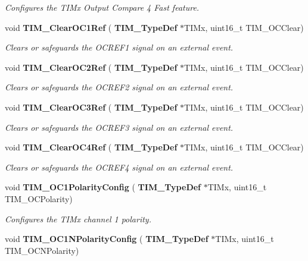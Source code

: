 \begin{DoxyCompactItemize}
\begin{DoxyCompactList}\small\item\em Configures the T\+I\+Mx Output Compare 4 Fast feature. \end{DoxyCompactList}\item 
void \textbf{ T\+I\+M\+\_\+\+Clear\+O\+C1\+Ref} (\textbf{ T\+I\+M\+\_\+\+Type\+Def} $\ast$T\+I\+Mx, uint16\+\_\+t T\+I\+M\+\_\+\+O\+C\+Clear)
\begin{DoxyCompactList}\small\item\em Clears or safeguards the O\+C\+R\+E\+F1 signal on an external event. \end{DoxyCompactList}\item 
void \textbf{ T\+I\+M\+\_\+\+Clear\+O\+C2\+Ref} (\textbf{ T\+I\+M\+\_\+\+Type\+Def} $\ast$T\+I\+Mx, uint16\+\_\+t T\+I\+M\+\_\+\+O\+C\+Clear)
\begin{DoxyCompactList}\small\item\em Clears or safeguards the O\+C\+R\+E\+F2 signal on an external event. \end{DoxyCompactList}\item 
void \textbf{ T\+I\+M\+\_\+\+Clear\+O\+C3\+Ref} (\textbf{ T\+I\+M\+\_\+\+Type\+Def} $\ast$T\+I\+Mx, uint16\+\_\+t T\+I\+M\+\_\+\+O\+C\+Clear)
\begin{DoxyCompactList}\small\item\em Clears or safeguards the O\+C\+R\+E\+F3 signal on an external event. \end{DoxyCompactList}\item 
void \textbf{ T\+I\+M\+\_\+\+Clear\+O\+C4\+Ref} (\textbf{ T\+I\+M\+\_\+\+Type\+Def} $\ast$T\+I\+Mx, uint16\+\_\+t T\+I\+M\+\_\+\+O\+C\+Clear)
\begin{DoxyCompactList}\small\item\em Clears or safeguards the O\+C\+R\+E\+F4 signal on an external event. \end{DoxyCompactList}\item 
void \textbf{ T\+I\+M\+\_\+\+O\+C1\+Polarity\+Config} (\textbf{ T\+I\+M\+\_\+\+Type\+Def} $\ast$T\+I\+Mx, uint16\+\_\+t T\+I\+M\+\_\+\+O\+C\+Polarity)
\begin{DoxyCompactList}\small\item\em Configures the T\+I\+Mx channel 1 polarity. \end{DoxyCompactList}\item 
void \textbf{ T\+I\+M\+\_\+\+O\+C1\+N\+Polarity\+Config} (\textbf{ T\+I\+M\+\_\+\+Type\+Def} $\ast$T\+I\+Mx, uint16\+\_\+t T\+I\+M\+\_\+\+O\+C\+N\+Polarity)

\end{DoxyCompactItemize}
